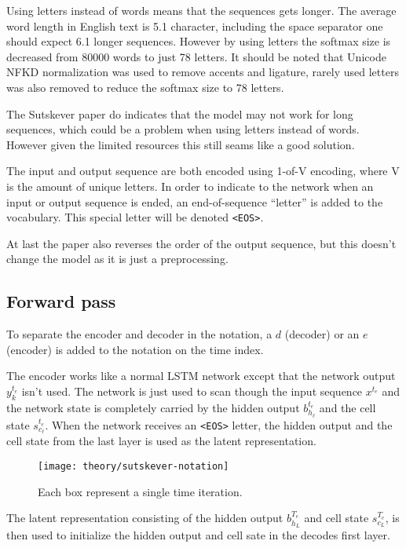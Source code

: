 Using letters instead of words means that the sequences gets longer. The average word length in English text is 5.1 character, including the space separator one should expect 6.1 longer sequences. However by using letters the softmax size is decreased from 80000 words to just 78 letters. It should be noted that Unicode NFKD normalization \cite{unicode-normalization} was used to remove accents and ligature, rarely used letters was also removed to reduce the softmax size to 78 letters.

The Sutskever paper \cite{sutskever} do indicates that the model may not work for long sequences, which could be a problem when using letters instead of words. However given the limited resources this still seams like a good solution.

The input and output sequence are both encoded using 1-of-V encoding, where V is the amount of unique letters. In order to indicate to the network when an input or output sequence is ended, an end-of-sequence ``letter'' is added to the vocabulary. This special letter will be denoted \texttt{<EOS>}.

At last the paper also reverses the order of the output sequence, but this doesn't change the model as it is just a preprocessing.

\subsection{Forward pass}

To separate the encoder and decoder in the notation, a $d$ (decoder) or an $e$ (encoder) is added to the notation on the time index.

The encoder works like a normal LSTM network except that the network output $y_k^{t_e}$ isn't used. The network is just used to scan though the input sequence $x^{t_e}$ and the network state is completely carried by the hidden output $b_{h_\ell}^{t_e}$ and the cell state $s_{c_\ell}^{t_e}$. When the network receives an \texttt{<EOS>} letter, the hidden output and the cell state from the last layer is used as the latent representation.

\begin{figure}[H]
	\centering
	\texttt{[image: theory/sutskever-notation]}
	\caption{Each box represent a single time iteration.}
\end{figure}

The latent representation consisting of the hidden output $b_{h_{L}}^{T_e}$ and cell state $s_{c_{L}}^{T_e}$, is then used to initialize the hidden output and cell sate in the decodes first layer.

